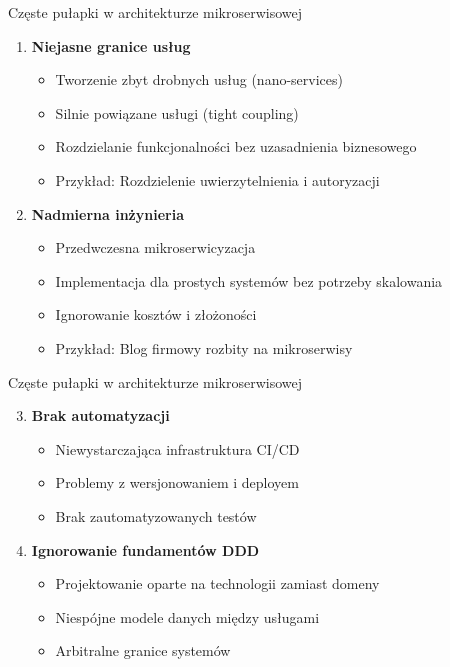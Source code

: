 \documentclass[aspectratio=169,xcolor=table]{beamer}
\begin{document}
\begin{frame}{Częste pułapki w architekturze mikroserwisowej}
  \begin{enumerate}
    \item \textbf{Niejasne granice usług}
      \begin{itemize}
        \item Tworzenie zbyt drobnych usług (nano-services)
        \item Silnie powiązane usługi (tight coupling)
        \item Rozdzielanie funkcjonalności bez uzasadnienia biznesowego
        \item Przykład: Rozdzielenie uwierzytelnienia i autoryzacji
      \end{itemize}
      
    \item \textbf{Nadmierna inżynieria}
      \begin{itemize}
        \item Przedwczesna mikroserwicyzacja
        \item Implementacja dla prostych systemów bez potrzeby skalowania
        \item Ignorowanie kosztów i złożoności
        \item Przykład: Blog firmowy rozbity na mikroserwisy
      \end{itemize}
    \end{enumerate}
\end{frame}
\begin{frame}{Częste pułapki w architekturze mikroserwisowej}
  \begin{enumerate}\setcounter{enumi}{2}
    \item \textbf{Brak automatyzacji}
      \begin{itemize}
        \item Niewystarczająca infrastruktura CI/CD
        \item Problemy z wersjonowaniem i deployem
        \item Brak zautomatyzowanych testów
      \end{itemize}
      
    \item \textbf{Ignorowanie fundamentów DDD}
      \begin{itemize}
        \item Projektowanie oparte na technologii zamiast domeny
        \item Niespójne modele danych między usługami
        \item Arbitralne granice systemów
      \end{itemize}
  \end{enumerate}
\end{frame}
\end{document}
